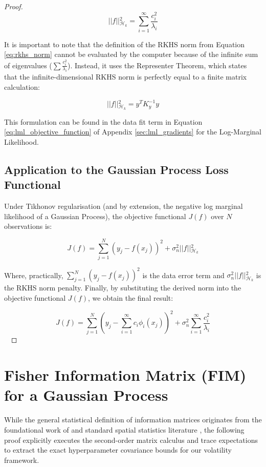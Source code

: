 \documentclass[12pt,oneside]{report}
\theoremstyle{definition}
\theoremstyle{remark}
\begin{document}
\begin{proof}
$$\vert{}\vert{}f\vert{}\vert{}_{\mathcal{H}_k}^2 = \sum_{i=1}^{\infty} \frac{c_i^2}{\lambda_i}$$

It is important to note that the definition of the RKHS norm from Equation \ref{eq:rkhs_norm} cannot be evaluated by the computer because of the infinite sum of eigenvalues ($\sum \frac{c_i^2}{\lambda_i}$). Instead, it uses the Representer Theorem, which states that the infinite-dimensional RKHS norm is perfectly equal to a finite matrix calculation:

$$\vert{}\vert{}f\vert{}\vert{}_{\mathcal{H}_k}^2 = y^T K_y^{-1} y$$

This formulation can be found in the data fit term in Equation \ref{eq:lml_objective_function} of Appendix \ref{sec:lml_gradients} for the Log-Marginal Likelihood.

\subsection{Application to the Gaussian Process Loss Functional}
Under Tikhonov regularisation (and by extension, the negative log marginal likelihood of a Gaussian Process), the objective functional $J(f)$ over $N$ observations is:

$$J(f) = \sum_{j=1}^{N} (y_j - f(x_j))^2 + \sigma_n^2 \vert{}\vert{}f\vert{}\vert{}_{\mathcal{H}_k}^2$$

Where, practically, $\sum_{j=1}^{N} (y_j - f(x_j))^2$ is the data error term and $\sigma_n^2 \vert{}\vert{}f\vert{}\vert{}_{\mathcal{H}_k}^2$ is the RKHS norm penalty. Finally, by substituting the derived norm into the objective functional $J(f)$, we obtain the final result:

$$J(f) = \sum_{j=1}^{N} \left( y_j - \sum_{i=1}^{\infty} c_i \phi_i(x_j) \right)^2 + \sigma_n^2 \sum_{i=1}^{\infty} \frac{c_i^2}{\lambda_i}$$\

\end{proof}

\newpage
\section{Fisher Information Matrix (FIM) for a Gaussian Process}
\label{sec:fim_gp}

While the general statistical definition of information matrices originates from the foundational work of \citet{fisher1922mathematical} and standard spatial statistics literature \citep{rasmussen2006gp}, the following proof explicitly executes the second-order matrix calculus and trace expectations to extract the exact hyperparameter covariance bounds for our volatility framework.
\end{document}
